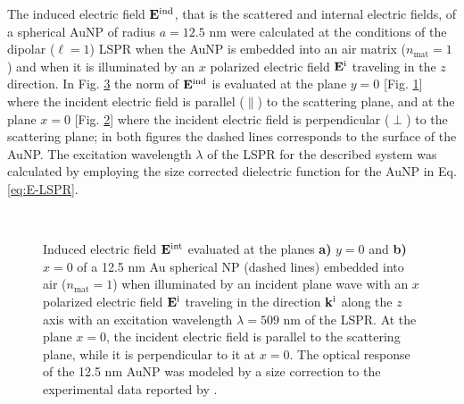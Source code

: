 The induced electric field $\vb{E}^\text{ind}$, that is the scattered and internal electric fields, of a spherical AuNP of radius $a = 12.5$ nm were calculated at the conditions of the dipolar ($\ell = 1$) LSPR when the AuNP is embedded into an air matrix ($n_\text{mat} = 1$) and when it is illuminated by an $x$ polarized electric field $\vb{E}^\text{i}$ traveling in the $z$ direction. In Fig. \ref{fig:NearField} the norm of $\vb{E}^\text{ind}$ is evaluated at the plane $y = 0$ [Fig. \ref{fig:NearField:par}] where the incident electric field is parallel ($\parallel$) to the scattering plane, and at the plane $x = 0$ [Fig. \ref{fig:NearField:perp}]  where the incident electric field is perpendicular ($\perp$) to the scattering plane; in both figures the dashed lines corresponds to the surface of the AuNP. The excitation wavelength $\lambda$ of the LSPR for the described system was calculated by employing the size corrected dielectric function for the AuNP in Eq. \eqref{eq:E-LSPR}.

\begin{figure}[h!]
	\def\svgwidth{\textwidth} \small\centering
		\vspace*{4.em}
		\hspace*{-.45\textwidth}
	\begin{subfigure}{.49\textwidth}%
		\caption{ } \label{fig:NearField:par}%
		\end{subfigure}%
	\begin{subfigure}{.49\textwidth}%
		\caption{ }\label{fig:NearField:perp}%
		\end{subfigure}%
	\vspace*{-7.em}\\
	\vspace*{-2em}
	\caption[Induced Electric Field of a 12.5 nm Au Spherical NP Embedded into Air at the LSPR]{Induced electric field $\vb{E}^\text{int}$ evaluated at the planes \textbf{a)} $y = 0$ and \textbf{b)} $x = 0$  of a 12.5 nm Au spherical NP (dashed lines) embedded into air ($n_\text{mat} = 1$) when illuminated by an incident plane wave with an $x$ polarized electric field $\vb{E}^\text{i}$ traveling in the direction $\vb{k}^\text{i}$ along the $z$ axis with an	 excitation wavelength $\lambda = 509$ nm of the LSPR. At the plane $x = 0$, the incident electric field is parallel to the scattering plane, while it is perpendicular to it at $x = 0$. The optical response of the 12.5 nm AuNP was modeled by a size correction to the experimental data reported by \citeauthor{johnson_optical_1972} \cite{johnson_optical_1972}.}
	\label{fig:NearField}
 \end{figure}

